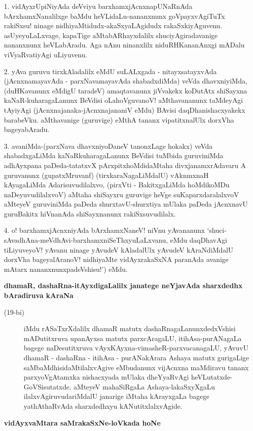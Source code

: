 \begin{artha}
1. vidAyxrUpiNiyAda deVviyu barxhamxjAcnxnapUNaRnAda bArxhamxNanalilxge baMdu heVLidaLu-\-nananxnunx goVpayxvAgiTuTx rakiSxsu! ninage nidhiyaMtidudx-akaSxya\-LAgidudx rakaSxkiyAguvenu. asUyeyuLaLxvage, kapaTige aMtabARhayxdalilx shuciyAgiradavanige nananxnunx heVLabAradu. Aga nAnu ninanxlilx niduRHKa\-nanAnxgi mADalu viVyaRvatiyAgi uLiyuvenu.
\end{artha}

\begin{artha}
2. yAva guruvu tirxkAladalilx eMdU suLALxgada - nitayxsatayxvAda (jAcnxnamayavAda - parxNava\-maya\-vAda shabadxdiMda) veVda dhavxniyiMda, (duHKavanunx eMdigU taradeV) amaqtavanunx jiVvakekx koDu\-tAtx shiSayxna kaNaR-kuharagaLanunx BeVdisi oLahoVguvanoV! aMthavananunx taMdeyAgi tAyi\-yAgi (jAcnxnajanaka-jAcnxnajananiV eMdu) BAvisi daqDhanishacxyakekx barabeVku. aMthavanige (guru\-vige) eMthA tananx vipatitxnalUlx dorxVha bageyabAradu.
\end{artha}

\begin{artha}
3. avaniMda-(parxNava dhavxniyoDaneV tanonxLage hokakx) veVda shabadxgaLiMda kaNaR\-kuharagaLanunx BeVdisi tuMbida guruviniMda adhAyxpana paDeda-tatatxvX pArxpitxhoMdidaMtaha divxjanamxrAdavaru A guruvanunx (gupatxM\-ruvanf) (tirxkaraNagaLiMdalU) vAknmxnaH kAyagaLiMda Adarisuvudilalxvo, (pirxVti - Bakitx\-gaLiMda hoMdi\-koMDu naDeyuvudilalxvoV) aMtaha shiSayxru guruvige heVge suKaparxda\-ralalxvoV aMteyeV guruviniMda paDeda shurxtavU-shurxtiya mUlaka paDeda jAcnxnavU guru\-Bakitx hiVnanAda shiSayxnanunx rakiSx\-suvudilalx.
\end{artha}

\begin{artha}
4. o! barxhamxjAcnxniyAda bArxhamxNaneV! niVnu yAvananunx `shuci-sAvadhAna-\-meVdhAvi-barxhamxniSeThx\-yuLaLx\-vanu, eMdu daqDhavAgi tiLiyuveyoV! yAvanu ninage yAvudeV kAladalUlx yAvudeV kAraNdiMdalU dorxVha bageyalAranoV! nidhiyaMte vidAyxrakaSxNA paranAda avanige mAtarx nananxnunxpadeVshisu!') eMdu.
\end{artha}

\newpage

{\bigskip
\noindent
{\large\bf dhamaR, dashaRna-itAyxdigaLalilx janatege neYjavAda sharxdedhx bAradiruva kAraNa}}\label{page50}
\begin{description}
\item[(19-bi)] iMdu rASaTxrXdalilx dhamaR matutx dashaRnagaLanunxdedxVshisi mADutitxruva upanAyxsa matutx parxcAra\-gaLU, itihAsa-purANagaLa bagege naDesutitxruva vAyxKAyxna-vimasheR-parxvacanagaLU, yAvuvU dhamaR - dashaRna - itihAsa - purANakArara Ashaya matutx gurigaLige saMbaMdhisidaMtilalx\-vAgive \-eMbudanunx vijAcnxna maMdiravu tananx parxyoVgAtamxka nishacxyada mUlaka dheYyaRvAgi heVLu\-tatxde-GoVSisutatxde. aMteyeV mahaSiRgaLa Ashaya-lakaSxyXgaLu ilalxvAgiruvudariMdalU jana\-rige iMtaha kArayxgaLa bagege yathAthaRvAda sharxdedhxyu kANutitxlalxvAgide.
\end{description}
{\medskip
\noindent
{\large\bf vidAyxvaMtara saMrakaSxNe-loVkada hoNe}}\label{page50c}
\medskip

